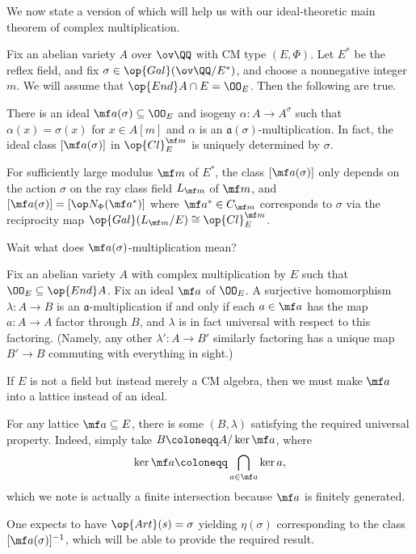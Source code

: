 \documentclass[../notes.tex]{subfiles}
\begin{document}
We now state a version of  which will help us with our ideal-theoretic main theorem of complex multiplication.
\begin{theorem}
	Fix an abelian variety $A$ over $\ov\QQ$ with CM type $(E,\Phi)$. Let $E^*$ be the reflex field, and fix $\sigma\in\op{Gal}(\ov\QQ/E^*)$, and choose a nonnegative integer $m$. We will assume that $\op{End}A\cap E=\OO_E$. Then the following are true.
	\begin{listalph}
		\item There is an ideal $\mf a(\sigma)\subseteq\OO_E$ and isogeny $\alpha\colon A\to A^\sigma$ such that $\alpha(x)=\sigma(x)$ for $x\in A[m]$ and $\alpha$ is an $\mathfrak a(\sigma)$-multiplication. In fact, the ideal class $[\mf a(\sigma)]$ in $\op{Cl}^{\mf m}_E$ is uniquely determined by $\sigma$.
		\item For sufficiently large modulus $\mf m$ of $E^*$, the class $[\mf a(\sigma)]$ only depends on the action $\sigma$ on the ray class field $L_{\mf m}$ of $\mf m$, and $[\mf a(\sigma)]=[\op N_\Phi(\mf a^*)]$ where $\mf a^*\in C_{\mf m}$ corresponds to $\sigma$ via the reciprocity map $\op{Gal}(L_{\mf m}/E)\cong\op{Cl}^{\mf m}_E$.
	\end{listalph}
\end{theorem}
Wait what does $\mf a(\sigma)$-multiplication mean?
\begin{definition}
	Fix an abelian variety $A$ with complex multiplication by $E$ such that $\OO_E\subseteq\op{End}A$. Fix an ideal $\mf a$ of $\OO_E$. A surjective homomorphism $\lambda\colon A\to B$ is an $\mathfrak a$-multiplication if and only if each $a\in\mf a$ has the map $a\colon A\to A$ factor through $B$, and $\lambda$ is in fact universal with respect to this factoring. (Namely, any other $\lambda'\colon A\to B'$ similarly factoring has a unique map $B'\to B$ commuting with everything in sight.)
\end{definition}
\begin{remark}
	If $E$ is not a field but instead merely a CM algebra, then we must make $\mf a$ into a lattice instead of an ideal.
\end{remark}
\begin{remark}
	For any lattice $\mf a\subseteq E$, there is some $(B,\lambda)$ satisfying the required universal property. Indeed, simply take $B\coloneqq A/\ker\mf a$, where
	\[\ker\mf a\coloneqq\bigcap_{a\in\mf a}\ker a,\]
	which we note is actually a finite intersection because $\mf a$ is finitely generated.
\end{remark}
\begin{remark}
	One expects to have $\op{Art}(s)=\sigma$ yielding $\eta(\sigma)$ corresponding to the class $[\mf a(\sigma)]^{-1}$, which will be able to provide the required result.
\end{remark}
\end{document}
